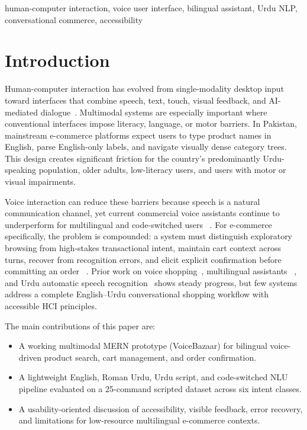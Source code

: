 \documentclass[conference]{IEEEtran}
\begin{document}
\begin{IEEEkeywords}
human-computer interaction, voice user interface, bilingual assistant,
Urdu NLP, conversational commerce, accessibility
\end{IEEEkeywords}

\section{Introduction}

Human-computer interaction has evolved from single-modality desktop
input toward interfaces that combine speech, text, touch, visual
feedback, and AI-mediated dialogue~\cite{mctear2016rise}. Multimodal
systems are especially important where conventional interfaces impose
literacy, language, or motor barriers. In Pakistan, mainstream
e-commerce platforms expect users to type product names in English,
parse English-only labels, and navigate visually dense category trees.
This design creates significant friction for the country's
predominantly Urdu-speaking population, older adults, low-literacy
users, and users with motor or visual impairments.

Voice interaction can reduce these barriers because speech is a natural
communication channel, yet current commercial voice assistants continue
to underperform for multilingual and code-switched users~%
\cite{choi2023multilingual,kann2022plurilingualism}. For e-commerce
specifically, the problem is compounded: a system must distinguish
exploratory browsing from high-stakes transactional intent, maintain
cart context across turns, recover from recognition errors, and elicit
explicit confirmation before committing an order~%
\cite{radlinski2017conversational,zamora2017dave}. Prior work on voice
shopping~\cite{rhee2020voice}, multilingual assistants~%
\cite{zhang2021language}, and Urdu automatic speech
recognition~\cite{arif2025wer,sharif2024urdu} shows steady progress,
but few systems address a complete English--Urdu conversational
shopping workflow with accessible HCI principles.

The main contributions of this paper are:
\begin{itemize}
  \item A working multimodal MERN prototype (VoiceBazaar) for bilingual
        voice-driven product search, cart management, and order
        confirmation.
  \item A lightweight English, Roman Urdu, Urdu script, and
        code-switched NLU pipeline evaluated on a 25-command scripted
        dataset across six intent classes.
  \item A usability-oriented discussion of accessibility, visible
        feedback, error recovery, and limitations for low-resource
        multilingual e-commerce contexts.
\end{itemize}
\end{document}
